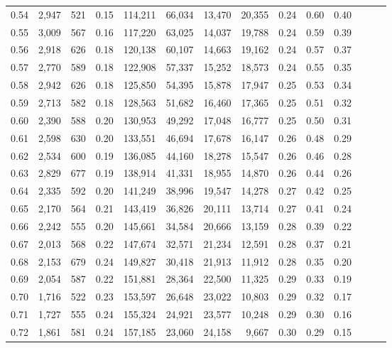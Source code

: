\begin{tabular}{rrrrrrrrrrrrrr}
0.54 &  2,947 &  521 &  0.15 &  114,211 &   66,034 &  13,470 &  20,355 &  0.24 &  0.60 &      0.40 \\
0.55 &  3,009 &  567 &  0.16 &  117,220 &   63,025 &  14,037 &  19,788 &  0.24 &  0.59 &      0.39 \\
0.56 &  2,918 &  626 &  0.18 &  120,138 &   60,107 &  14,663 &  19,162 &  0.24 &  0.57 &      0.37 \\
0.57 &  2,770 &  589 &  0.18 &  122,908 &   57,337 &  15,252 &  18,573 &  0.24 &  0.55 &      0.35 \\
0.58 &  2,942 &  626 &  0.18 &  125,850 &   54,395 &  15,878 &  17,947 &  0.25 &  0.53 &      0.34 \\
0.59 &  2,713 &  582 &  0.18 &  128,563 &   51,682 &  16,460 &  17,365 &  0.25 &  0.51 &      0.32 \\
0.60 &  2,390 &  588 &  0.20 &  130,953 &   49,292 &  17,048 &  16,777 &  0.25 &  0.50 &      0.31 \\
0.61 &  2,598 &  630 &  0.20 &  133,551 &   46,694 &  17,678 &  16,147 &  0.26 &  0.48 &      0.29 \\
0.62 &  2,534 &  600 &  0.19 &  136,085 &   44,160 &  18,278 &  15,547 &  0.26 &  0.46 &      0.28 \\
0.63 &  2,829 &  677 &  0.19 &  138,914 &   41,331 &  18,955 &  14,870 &  0.26 &  0.44 &      0.26 \\
0.64 &  2,335 &  592 &  0.20 &  141,249 &   38,996 &  19,547 &  14,278 &  0.27 &  0.42 &      0.25 \\
0.65 &  2,170 &  564 &  0.21 &  143,419 &   36,826 &  20,111 &  13,714 &  0.27 &  0.41 &      0.24 \\
0.66 &  2,242 &  555 &  0.20 &  145,661 &   34,584 &  20,666 &  13,159 &  0.28 &  0.39 &      0.22 \\
0.67 &  2,013 &  568 &  0.22 &  147,674 &   32,571 &  21,234 &  12,591 &  0.28 &  0.37 &      0.21 \\
0.68 &  2,153 &  679 &  0.24 &  149,827 &   30,418 &  21,913 &  11,912 &  0.28 &  0.35 &      0.20 \\
0.69 &  2,054 &  587 &  0.22 &  151,881 &   28,364 &  22,500 &  11,325 &  0.29 &  0.33 &      0.19 \\
0.70 &  1,716 &  522 &  0.23 &  153,597 &   26,648 &  23,022 &  10,803 &  0.29 &  0.32 &      0.17 \\
0.71 &  1,727 &  555 &  0.24 &  155,324 &   24,921 &  23,577 &  10,248 &  0.29 &  0.30 &      0.16 \\
0.72 &  1,861 &  581 &  0.24 &  157,185 &   23,060 &  24,158 &   9,667 &  0.30 &  0.29 &      0.15 \\

\end{tabular}
